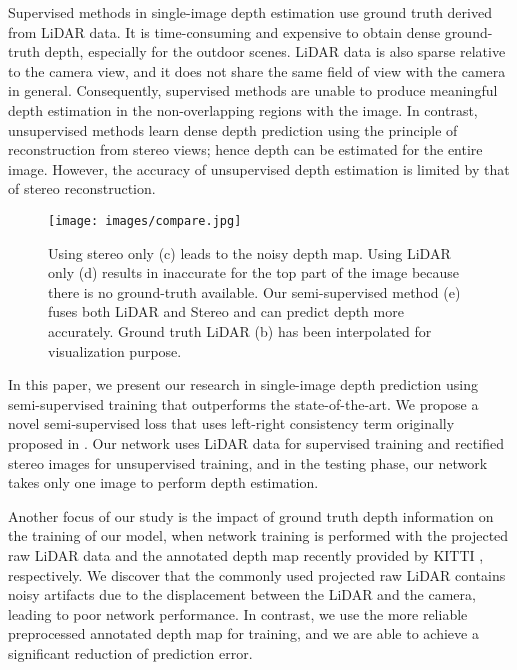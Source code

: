 \documentclass[letterpaper, 10 pt, conference]{ieeeconf}
\begin{document}
Supervised methods in single-image depth estimation use ground truth derived from LiDAR data. It is time-consuming and expensive to obtain dense ground-truth depth, especially for the outdoor scenes. LiDAR data is also sparse relative to the camera view, and it does not share the same field of view with the camera in general. Consequently, supervised methods are unable to produce meaningful depth estimation in the non-overlapping regions with the image.
In contrast, unsupervised methods learn dense depth prediction using the principle of reconstruction from stereo views; hence depth can be estimated for the entire image. However, the accuracy of unsupervised depth estimation is limited by that of stereo reconstruction.\\



 \begin{figure} 
        \centering
        \texttt{[image: images/compare.jpg]}
        \caption{Using stereo only (c) leads to the noisy depth map. Using LiDAR only (d) results in inaccurate for the top part of the image because there is no ground-truth available. Our semi-supervised method (e) fuses both LiDAR and Stereo and can predict depth more accurately. Ground truth LiDAR (b) has been interpolated for visualization purpose.}
        \label{fig:loss}
    \end{figure}
In this paper, we present our research in single-image depth prediction using semi-supervised training that outperforms the state-of-the-art. We propose a novel semi-supervised loss that uses left-right consistency term originally proposed in \cite{godard2017unsupervised}. Our network uses LiDAR data for supervised training and rectified stereo images for unsupervised training, and in the testing phase, our network takes only one image to perform depth estimation. 

Another focus of our study is the impact of ground truth depth information on the training of our model, when network training is performed with the projected raw LiDAR data and the annotated depth map recently provided by KITTI \cite{Uhrig2017THREEDV}, respectively. We discover that the commonly used projected raw LiDAR contains noisy artifacts due to the displacement between the LiDAR and the camera, leading to poor network performance. In contrast, we use the more reliable preprocessed annotated depth map for training, and we are able to achieve a significant reduction of prediction error.
\end{document}
